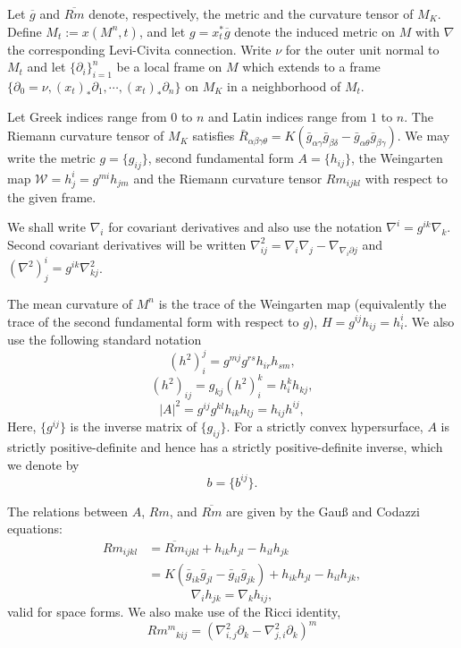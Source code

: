 \documentclass{amsart}
\begin{document}
Let $\overline{g}$ and $\overline{Rm}$ denote, respectively, the metric and the curvature tensor of $M_K$. Define \(M_t := x(M^n,t)\), and let \(g = x_t^{\ast} \overline{g}\) denote the induced metric on \(M\) with $\nabla$ the corresponding Levi-Civita connection. Write $\nu$ for the outer unit normal to $M_t$ and let \(\{\partial_i\}_{i=1}^n\) be a local frame on \(M\) which extends to a frame \(\{\partial_0 = \nu, (x_t)_{\ast} \partial_1, \cdots, (x_t)_{\ast} \partial_n\}\) on \(M_K\) in a neighborhood of \(M_t\).

Let Greek indices range from \(0\) to \(n\) and Latin indices range from \(1\) to \(n\). The Riemann curvature tensor of \(M_K\) satisfies \(\bar{R}_{\alpha\beta\gamma\theta} = K(\bar{g}_{\alpha\gamma}\bar{g}_{\beta\delta} - \bar{g}_{\alpha\theta}\bar{g}_{\beta\gamma})\). We may write the metric $g = \{g_{ij}\}$, second fundamental form $A = \{h_{ij}\}$, the Weingarten map $\mathcal{W} = h^i_j = g^{mi} h_{jm}$ and the Riemann curvature tensor $Rm_{ijkl}$ with respect to the given frame.

We shall write \(\nabla_i\) for covariant derivatives and also use the notation \(\nabla^i = g^{ik} \nabla_k\). Second covariant derivatives will be written \(\nabla^2_{ij} = \nabla_i \nabla_j - \nabla_{\nabla_i \partial j}\) and \((\nabla^2)^i_j = g^{ik} \nabla^2_{kj}\).

The mean curvature of $M^n$ is the trace of the Weingarten map (equivalently the trace of the second fundamental form with respect to $g$), $H = g^{ij}h_{ij} = h^i_i$. We also use the following standard notation
\[
(h^2)_i^j = g^{mj}g^{rs}h_{ir}h_{sm},
\]
\[
(h^2)_{ij} = g_{kj} (h^2)_i^k = h^k_i h_{kj},
\]
\[
|A|^2 = g^{ij}g^{kl}h_{ik}h_{lj} = h_{ij}h^{ij},
\]
Here, $\{g^{ij}\}$ is the inverse matrix of $\{g_{ij}\}.$ For a strictly convex hypersurface, \(A\) is strictly positive-definite and hence has a strictly positive-definite inverse, which we denote by
\[
b = \{b^{ij}\}.
\]

The relations between $A$, $Rm$, and $\overline{Rm}$ are given by the Gau{\ss} and Codazzi equations:
\[
\begin{split}
Rm_{ijkl} &= \overline{Rm}_{ijkl} + h_{ik}h_{jl} - h_{il}h_{jk} \\
&= K(\bar{g}_{ik}\bar{g}_{jl} - \bar{g}_{il}\bar{g}_{jk}) + h_{ik}h_{jl} - h_{il}h_{jk},
\end{split}
\]
\[
\nabla_i h_{jk} = \nabla_k h_{ij},
\]
valid for space forms. We also make use of the Ricci identity,
\[
{Rm^m}_{kij}  = \left(\nabla^2_{i, j} \partial_k - \nabla^2_{j,i} \partial_k\right)^m
\]
\end{document}
